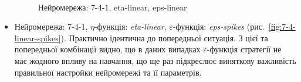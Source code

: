 \documentclass[a4paper,10pt,fleqn]{article}
\begin{document}
\begin{itemize}
\begin{figure}[h!]
  \centering
  \,
  \,
  \caption{Нейромережа: 7-4-1, eta-linear, eps-linear}
  \label{fig:7-4-linear-linear}
\end{figure}

\item Нейромережа: 7-4-1, $\eta$-функція: \textit{eta-linear}, $\varepsilon$-функція: \textit{eps-spikes} (рис.~\ref{fig:7-4-linear-spikes}). Практично ідентична до попередньої ситуація. З цієї та попередньої комбінації видно, що в даних випадках $\varepsilon$-функція стратегії не має жодного впливу на навчання, що ще раз підкреслює виняткову важливість правильної настройки нейромережі та її параметрів.
\end{itemize}
\end{document}
